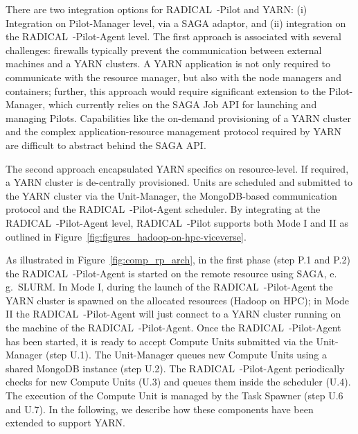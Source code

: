 There are two integration options for RADICAL~-Pilot and YARN: (i) Integration on Pilot-Manager level, via a SAGA adaptor, and (ii) integration on the RADICAL~-Pilot-Agent level.
The first approach is associated with several challenges: firewalls typically prevent the communication between external machines and a YARN clusters.
A YARN application is not only required to communicate with the resource manager, but also with the node managers and containers; further, this approach would require significant extension to the Pilot-Manager, which currently relies on the SAGA Job API for launching and managing Pilots.
Capabilities like the on-demand provisioning of a YARN cluster and the complex application-resource management protocol required by YARN are difficult to abstract behind the SAGA API.  

The second approach encapsulated YARN specifics on resource-level.
If required, a YARN cluster is de-centrally provisioned.
Units are scheduled and submitted to the YARN cluster via the Unit-Manager, the MongoDB-based communication protocol and the RADICAL~-Pilot-Agent scheduler.
By integrating at the RADICAL~-Pilot-Agent level, RADICAL~-Pilot supports both Mode I and II as outlined in Figure~\ref{fig:figures_hadoop-on-hpc-viceverse}.

As illustrated in Figure~\ref{fig:comp_rp_arch}, in the first phase (step P.1 and P.2) the RADICAL~-Pilot-Agent is started on the remote resource using SAGA, e.\,g.\ SLURM.
In Mode I, during the launch of the RADICAL~-Pilot-Agent the YARN cluster is spawned on the allocated resources (Hadoop on HPC); in Mode II the RADICAL~-Pilot-Agent will just connect to a YARN cluster running on the machine of the RADICAL~-Pilot-Agent.
Once the RADICAL~-Pilot-Agent has been started, it is ready to accept Compute Units submitted via the Unit-Manager (step U.1).
The Unit-Manager queues new Compute Units using a shared MongoDB instance (step U.2).
The RADICAL~-Pilot-Agent periodically checks for new Compute Units (U.3) and queues them inside the scheduler (U.4).
The execution of the Compute Unit is managed by the Task Spawner (step U.6 and U.7).
In the following, we describe how these components have been extended to support YARN.


